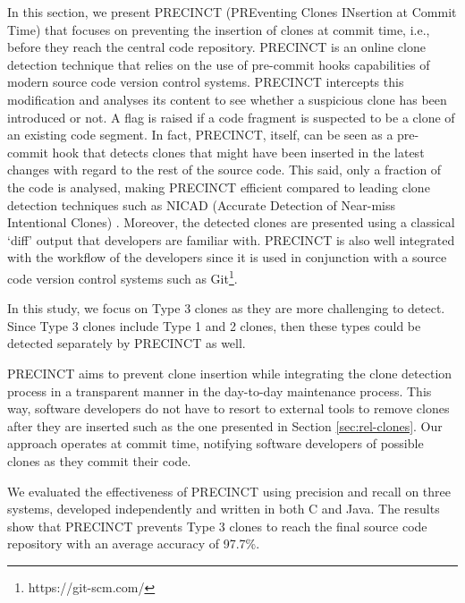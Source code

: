 

In this section, we present PRECINCT (PREventing Clones INsertion at Commit Time) that focuses on preventing the insertion of clones at commit time, i.e., before they reach the central code repository. PRECINCT is an online clone detection technique that relies on the use of pre-commit hooks capabilities of modern source code version control systems.
PRECINCT intercepts this modification and analyses its  content to see whether a suspicious clone has been introduced or not.
A flag is raised if a code fragment is suspected to be a clone of an existing code segment.
In fact, PRECINCT, itself, can be seen as a pre-commit hook that detects clones that might have been inserted in the latest changes with regard to the rest of the source code.
This said, only a fraction of the code is analysed, making PRECINCT efficient compared to leading  clone detection techniques such as NICAD (Accurate Detection of Near-miss Intentional Clones) \cite{Cordy2011}.
Moreover, the detected clones are presented using a classical `diff' output that developers are familiar with.
PRECINCT is also well integrated with the workflow of the developers since it is used in conjunction with a source code version control systems such as Git\footnote{https://git-scm.com/}.

In this study, we focus on Type 3 clones as they are more challenging to detect. Since Type 3 clones include Type 1 and 2 clones, then these types could be detected separately by PRECINCT as well.

PRECINCT aims to prevent clone insertion while integrating
the clone detection process in a transparent manner
in the day-to-day maintenance process.
This way, software developers do not have to resort to external tools to remove clones after they are inserted such as the one presented in Section \ref{sec:rel-clones}.
Our approach operates at commit time, notifying software developers of possible clones as they commit their code.

We evaluated the effectiveness of PRECINCT using precision and recall on three systems, developed independently and written in both C and Java. The results show that PRECINCT prevents Type 3 clones to reach the final source code repository with an average accuracy of 97.7\%.

